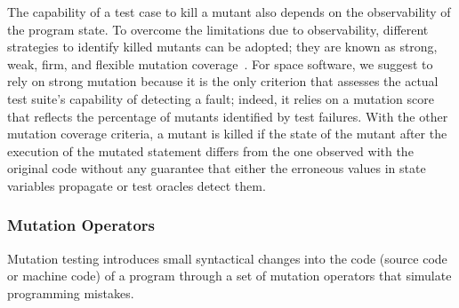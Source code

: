 The capability of a test case to kill a mutant also depends on the observability of the program state. To overcome the limitations due to observability, different strategies to identify killed mutants can be adopted; they are known as strong, weak, firm, and flexible mutation coverage~\cite{ammann2016introduction}. For space software, we suggest to rely on strong mutation because it is the only criterion that assesses the actual test suite's capability of detecting a fault; indeed, it relies on a mutation score that reflects the percentage of mutants identified by test failures. With the other mutation coverage criteria, a mutant is killed if the state of the mutant after the execution of the mutated statement differs from the one observed with the original code without any guarantee that either the erroneous values in state variables propagate or test oracles detect them. 




\subsubsection{Mutation Operators}
\label{sec:related:operators}

%


Mutation testing introduces small syntactical changes into the code (source code or machine code) of a program through a set of mutation operators that simulate programming mistakes. 



